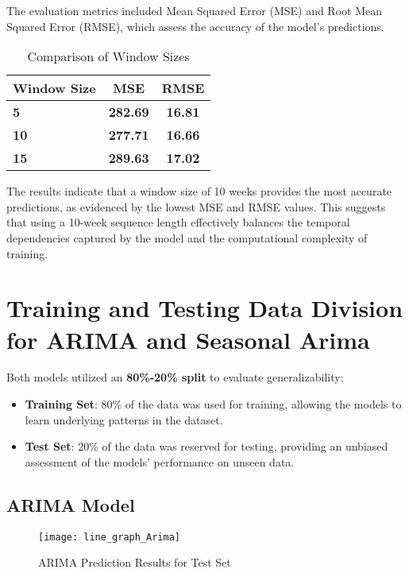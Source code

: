 The evaluation metrics included Mean Squared Error (MSE) and Root Mean Squared Error (RMSE), which assess the accuracy of the model's predictions.
\begin{table}[h!]
	\centering
	\begin{tabular}{|l|c|c|}
		\hline
		\textbf{Window Size} & \textbf{MSE} & \textbf{RMSE} \\ \hline
		\textbf{5} & \textbf{282.69} & \textbf{16.81} \\ \hline
		\textbf{10} & \textbf{277.71} & \textbf{16.66} \\ \hline
		\textbf{15} & \textbf{289.63} & \textbf{17.02} \\ \hline
	\end{tabular}
	\caption{Comparison of Window Sizes}
	\label{tab:comparison_of_lstm}
\end{table}

The results indicate that a window size of 10 weeks provides the most accurate predictions, as evidenced by the lowest MSE and RMSE values. This suggests that using a 10-week sequence length effectively balances the temporal dependencies captured by the model and the computational complexity of training.



\section*{Training and Testing Data Division for ARIMA and Seasonal Arima}
Both models utilized an \textbf{80\%-20\% split} to evaluate generalizability:
\begin{itemize}
	\item \textbf{Training Set}: 80\% of the data was used for training, allowing the models to learn underlying patterns in the dataset.
	\item \textbf{Test Set}: 20\% of the data was reserved for testing, providing an unbiased assessment of the models' performance on unseen data.
\end{itemize}
\subsection{ARIMA Model}

\begin{figure}[H]
	\centering
	\texttt{[image: line\_graph\_Arima]}
	\caption{ARIMA Prediction Results for Test Set}
	\label{fig:Arima_result}
\end{figure}


